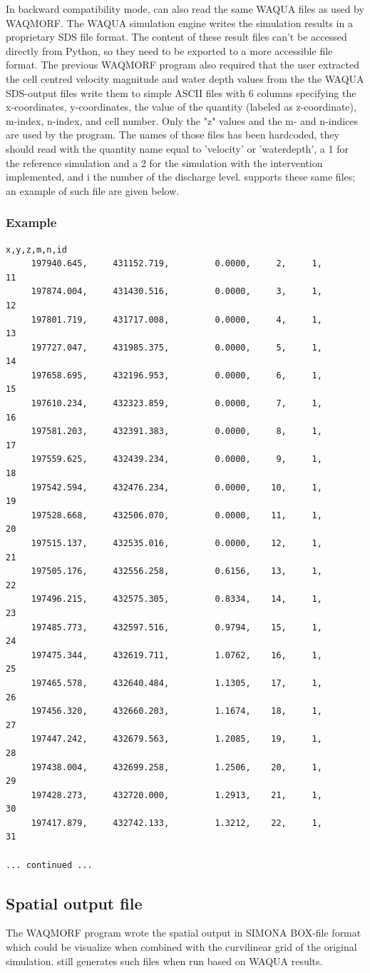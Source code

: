 In backward compatibility mode, \dfmi can also read the same WAQUA files as used by WAQMORF.
The WAQUA simulation engine writes the simulation results in a proprietary SDS file format.
The content of these result files can't be accessed directly from Python, so they need to be exported to a more accessible file format.
The previous WAQMORF program also required that the user extracted the cell centred velocity magnitude and water depth values from the the WAQUA SDS-output files write them to simple ASCII files with 6 columns specifying the x-coordinates, y-coordinates, the value of the quantity (labeled as z-coordinate), m-index, n-index, and cell number.
Only the "z" values and the m- and n-indices are used by the program.
The names of those files has been hardcoded, they should read  with the quantity name equal to 'velocity' or 'waterdepth', a 1 for the reference simulation and a 2 for the simulation with the intervention implemented, and i the number of the discharge level.
\dfastmi supports these same files; an example of such file are given below.

\subsubsection*{Example}

\begin{Verbatim}
x,y,z,m,n,id
     197940.645,     431152.719,         0.0000,     2,     1,        11
     197874.004,     431430.516,         0.0000,     3,     1,        12
     197801.719,     431717.008,         0.0000,     4,     1,        13
     197727.047,     431985.375,         0.0000,     5,     1,        14
     197658.695,     432196.953,         0.0000,     6,     1,        15
     197610.234,     432323.859,         0.0000,     7,     1,        16
     197581.203,     432391.383,         0.0000,     8,     1,        17
     197559.625,     432439.234,         0.0000,     9,     1,        18
     197542.594,     432476.234,         0.0000,    10,     1,        19
     197528.668,     432506.070,         0.0000,    11,     1,        20
     197515.137,     432535.016,         0.0000,    12,     1,        21
     197505.176,     432556.258,         0.6156,    13,     1,        22
     197496.215,     432575.305,         0.8334,    14,     1,        23
     197485.773,     432597.516,         0.9794,    15,     1,        24
     197475.344,     432619.711,         1.0762,    16,     1,        25
     197465.578,     432640.484,         1.1305,    17,     1,        26
     197456.320,     432660.203,         1.1674,    18,     1,        27
     197447.242,     432679.563,         1.2085,    19,     1,        28
     197438.004,     432699.258,         1.2506,    20,     1,        29
     197428.273,     432720.000,         1.2913,    21,     1,        30
     197417.879,     432742.133,         1.3212,    22,     1,        31 

... continued ...
\end{Verbatim}


\subsection{Spatial output file}

The WAQMORF program wrote the spatial output in SIMONA BOX-file format which could be visualize when combined with the curvilinear grid of the original simulation.
\dfastmi still generates such files when run based on WAQUA results.
